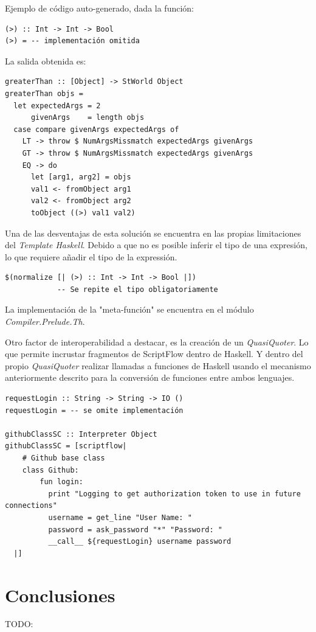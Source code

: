 \documentclass[11pt]{article}
\begin{document}
Ejemplo de código auto-generado, dada la función:
\begin{verbatim}
(>) :: Int -> Int -> Bool
(>) = -- implementación omitida
\end{verbatim}

La salida obtenida es:
\begin{verbatim}
greaterThan :: [Object] -> StWorld Object
greaterThan objs =
  let expectedArgs = 2
      givenArgs    = length objs
  case compare givenArgs expectedArgs of
    LT -> throw $ NumArgsMissmatch expectedArgs givenArgs
    GT -> throw $ NumArgsMissmatch expectedArgs givenArgs
    EQ -> do
      let [arg1, arg2] = objs
      val1 <- fromObject arg1
      val2 <- fromObject arg2
      toObject ((>) val1 val2)
\end{verbatim}

Una de las desventajas de esta solución se encuentra en las propias limitaciones del \emph{Template Haskell}. Debido a que no es posible
inferir el tipo de una expresión, lo que requiere añadir el tipo de la expressión.
\begin{verbatim}
$(normalize [| (>) :: Int -> Int -> Bool |])
            -- Se repite el tipo obligatoriamente
\end{verbatim}

La implementación de la "meta-función" se encuentra en el módulo \emph{Compiler.Prelude.Th}.

Otro factor de interoperabilidad a destacar, es la creación de un \emph{QuasiQuoter}. Lo que permite incrustar fragmentos de ScriptFlow
dentro de Haskell. Y dentro del propio \emph{QuasiQuoter} realizar llamadas a funciones de Haskell usando el mecanismo anteriormente descrito
para la conversión de funciones entre ambos lenguajes.

\begin{verbatim}
requestLogin :: String -> String -> IO ()
requestLogin = -- se omite implementación

githubClassSC :: Interpreter Object
githubClassSC = [scriptflow|
    # Github base class
    class Github:
        fun login:
          print "Logging to get authorization token to use in future connections"
          username = get_line "User Name: "
          password = ask_password "*" "Password: "
          __call__ ${requestLogin} username password
  |]
\end{verbatim}

\section{Conclusiones}
\label{sec:orgbda8938}

TODO:
\end{document}
